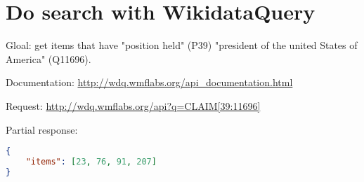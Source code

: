 \section{Do search with WikidataQuery}

Gloal: get items that have "position held" (P39) "president of the united States of America" (Q11696).

Documentation: \url{http://wdq.wmflabs.org/api_documentation.html}

Request: \url{http://wdq.wmflabs.org/api?q=CLAIM[39:11696]}

Partial response:
\begin{lstlisting}[language=json]
{
    "items": [23, 76, 91, 207]
}
\end{lstlisting}